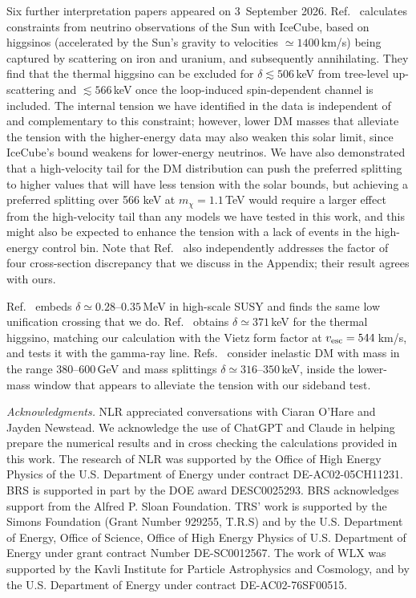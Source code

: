 \documentclass[reprint,superscriptaddress,preprintnumbers,amsmath,amssymb,aps,prd,tightenlines,longbibliography,nofootinbib]{revtex4-2}
\begin{document}
Six further interpretation papers appeared on 3~September 2026.
Ref.~\cite{Pospelov:2026SolarCapture} calculates constraints from neutrino observations of the Sun with IceCube, based on higgsinos (accelerated by the Sun's gravity to velocities $\simeq1400$\,km/s) being captured by scattering on iron and uranium, and subsequently annihilating. They find that the thermal higgsino can be excluded for $\delta\lesssim506$\,keV from tree-level up-scattering and
$\lesssim566$\,keV once the loop-induced spin-dependent channel is
included. The internal tension we have identified in the data is independent of and complementary to this constraint; however, lower DM masses that alleviate the tension with the higher-energy data may also weaken this solar limit, since IceCube's bound weakens for lower-energy neutrinos. We have also demonstrated that a high-velocity tail for the DM distribution can push the preferred splitting to higher values that will have less tension with the solar bounds, but achieving a preferred splitting over 566 keV at $m_\chi=1.1$\,TeV would require a larger effect from the high-velocity tail than any models we have tested in this work, and this might also be expected to enhance the tension with a lack of events in the high-energy control bin.  Note that Ref.~\cite{Pospelov:2026SolarCapture} also independently addresses the factor of four cross-section discrepancy that we discuss in the Appendix; their result agrees with ours.

Ref.~\cite{Yin:2026PQSUSY}
embeds $\delta\simeq0.28$--$0.35$\,MeV in high-scale SUSY and finds the
same low unification crossing that we do.
Ref.~\cite{DiMauro:2026KinematicEdge} obtains $\delta\simeq371$\,keV for
the thermal higgsino, matching our calculation with the Vietz form factor at $v_{\rm
esc}=544$\,km/s, and tests it with the gamma-ray line.
Refs.~\cite{Nomura:2026Z2Partner,Visinelli:2026PQInelastic,Yamashita:2026InelasticDP}
consider inelastic DM with mass in the range $380$--$600$\,GeV and mass splittings
$\delta\simeq316$--$350$\,keV, inside the lower-mass window that appears to alleviate the tension with our
sideband test.


\textit{Acknowledgments.}
%
NLR appreciated conversations with Ciaran O'Hare and Jayden Newstead.
We acknowledge the use of ChatGPT and Claude in helping prepare the numerical results and in cross checking the calculations provided in this work.
The research of NLR was supported by the Office of High Energy Physics of the U.S. Department of Energy under contract DE-AC02-05CH11231.
BRS is supported in part by the DOE award DESC0025293. 
BRS acknowledges support from the Alfred P. Sloan Foundation. TRS' work is supported by the Simons Foundation (Grant Number 929255, T.R.S) and by the U.S. Department of Energy, Office of Science, Office of High Energy Physics of U.S. Department of Energy under grant contract Number DE-SC0012567. The work of WLX
was supported by the Kavli Institute for Particle Astrophysics and Cosmology, and by the
U.S. Department of Energy under contract DE-AC02-76SF00515.
\end{document}
